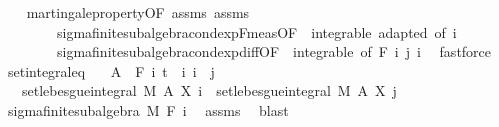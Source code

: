 \begin{isabellebody}
%
\isadelimproof
\ \ %
\endisadelimproof
%
\isatagproof
{}\isamarkupfalse%
\ martingale{\isacharunderscore}{\kern0pt}property{\isacharbrackleft}{\kern0pt}OF\ assms{\isacharbrackright}{\kern0pt}\ assms\isanewline
\ \ \ \ \ \ \ \ sigma{\isacharunderscore}{\kern0pt}finite{\isacharunderscore}{\kern0pt}subalgebra{\isachardot}{\kern0pt}cond{\isacharunderscore}{\kern0pt}exp{\isacharunderscore}{\kern0pt}F{\isacharunderscore}{\kern0pt}meas{\isacharbrackleft}{\kern0pt}OF\ {\isacharunderscore}{\kern0pt}\ integrable\ adapted{\isacharcomma}{\kern0pt}\ of\ i{\isacharbrackright}{\kern0pt}\isanewline
\ \ \ \ \ \ \ \ sigma{\isacharunderscore}{\kern0pt}finite{\isacharunderscore}{\kern0pt}subalgebra{\isachardot}{\kern0pt}cond{\isacharunderscore}{\kern0pt}exp{\isacharunderscore}{\kern0pt}diff{\isacharbrackleft}{\kern0pt}OF\ {\isacharunderscore}{\kern0pt}\ integrable{\isacharparenleft}{\kern0pt}{}{\isacharcomma}{\kern0pt}{}{\isacharparenright}{\kern0pt}{\isacharcomma}{\kern0pt}\ of\ {\isachardoublequoteopen}F\ i{\isachardoublequoteclose}\ j\ i{\isacharbrackright}{\kern0pt}\ \isamarkupfalse%
\ fastforce%
\endisatagproof
{\isafoldproof}%
%
\isadelimproof
\isanewline
%
\endisadelimproof
\isanewline
{}\isamarkupfalse%
\ set{\isacharunderscore}{\kern0pt}integral{\isacharunderscore}{\kern0pt}eq{\isacharcolon}{\kern0pt}\isanewline
\ \ \ {\isachardoublequoteopen}A\ {\isasymin}\ F\ i{\isachardoublequoteclose}\ {\isachardoublequoteopen}t\ {\isasymle}\ i{\isachardoublequoteclose}\ {\isachardoublequoteopen}i\ {\isasymle}\ j{\isachardoublequoteclose}\isanewline
\ \ \ {\isachardoublequoteopen}set{\isacharunderscore}{\kern0pt}lebesgue{\isacharunderscore}{\kern0pt}integral\ M\ A\ {\isacharparenleft}{\kern0pt}X\ i{\isacharparenright}{\kern0pt}\ {\isacharequal}{\kern0pt}\ set{\isacharunderscore}{\kern0pt}lebesgue{\isacharunderscore}{\kern0pt}integral\ M\ A\ {\isacharparenleft}{\kern0pt}X\ j{\isacharparenright}{\kern0pt}{\isachardoublequoteclose}\isanewline
%
\isadelimproof
%
\endisadelimproof
%
\isatagproof
{}\isamarkupfalse%
\ {\isacharminus}{\kern0pt}\isanewline
\ \ \isamarkupfalse%
\ sigma{\isacharunderscore}{\kern0pt}finite{\isacharunderscore}{\kern0pt}subalgebra\ M\ {\isachardoublequoteopen}F\ i{\isachardoublequoteclose}\ \isamarkupfalse%
\ assms{\isacharparenleft}{\kern0pt}{}{\isacharparenright}{\kern0pt}\ \isamarkupfalse%
\ blast\isanewline
\ \ \isamarkupfalse%

\end{isabellebody}
